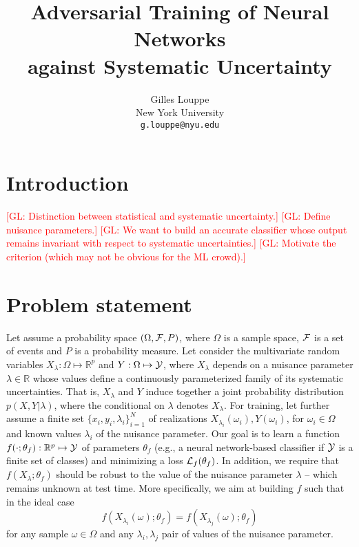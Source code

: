 \documentclass{article}
\title{Adversarial Training of Neural Networks\\
against Systematic Uncertainty}
\author{
  Gilles Louppe \\
  New York University\\
  \texttt{g.louppe@nyu.edu} \\
}
\newcommand{\glnote}[1]{\textcolor{red}{[GL: #1]}}
\theoremstyle{plain}
\begin{document}

\maketitle

\begin{abstract}
\end{abstract}

\section{Introduction}

\glnote{Distinction between statistical and systematic uncertainty.}
\glnote{Define nuisance parameters.}
\glnote{We want to build an accurate classifier whose output remains invariant with
respect to systematic uncertainties.}
\glnote{Motivate the criterion (which may not be obvious for the ML crowd).}



\section{Problem statement}
\label{sec:problem}

Let assume a probability space $(\Omega, {\cal F}, P)$, where $\Omega$ is a
sample space, ${\cal F}$ is a set of events and $P$ is a probability measure.
Let consider the multivariate random variables $X_\lambda: \Omega \mapsto
\mathbb{R}^p$ and $Y: \Omega \mapsto {\cal Y}$, where $X_\lambda$ depends on a
nuisance parameter $\lambda \in \mathbb{R}$ whose values define a continuously
parameterized family of its systematic uncertainties. That is, $X_\lambda$ and
$Y$ induce together a joint probability distribution $p(X,Y|\lambda)$, where the
conditional on $\lambda$ denotes $X_\lambda$. For training, let further assume a
finite set $\{ x_i, y_i, \lambda_i \}_{i=1}^N$ of realizations
$X_{\lambda_i}(\omega_i), Y(\omega_i)$, for $\omega_i \in \Omega$ and known
values $\lambda_i$ of the nuisance parameter. Our goal is to learn a function
$f(\cdot;\theta_f) : \mathbb{R}^p \mapsto {\cal Y}$ of parameters $\theta_f$
(e.g., a neural network-based classifier if ${\cal Y}$ is a finite set of
classes) and minimizing  a loss ${\cal L}_f(\theta_f)$. In addition, we require
that $f(X_\lambda ; \theta_f)$ should be robust to the value of the nuisance parameter $\lambda$ --
which remains unknown at test time. More specifically, we aim at building $f$
such that in the ideal case
\begin{equation}\label{eqn:criterion-true}
f(X_{\lambda_i}(\omega) ; \theta_f) = f(X_{\lambda_j}(\omega) ; \theta_f)
\end{equation} for any
sample $\omega \in \Omega$ and any $\lambda_i, \lambda_j$ pair of values of the
nuisance parameter.
\end{document}
